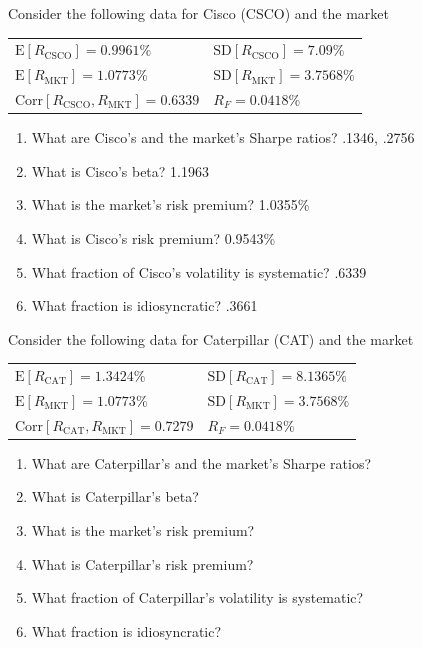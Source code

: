 \documentclass{beamer}
\begin{document}
\begin{frame}{}
	Consider the following data for Cisco (CSCO) and the market
	\begin{center}
		\begin{tabular}{ll}
			$\text{E}[R_{\text{CSCO}}]=0.9961\%$ & $\text{SD}[R_{\text{CSCO}}]=7.09\%$ \\
			$\text{E}[R_{\text{MKT}}]=1.0773\%$ & $\text{SD}[R_{\text{MKT}}]=3.7568\%$ \\
			$\text{Corr}[R_{\text{CSCO}},R_{\text{MKT}}]=0.6339$ & $R_{F}=0.0418\%$
		\end{tabular}
	\end{center}
\begin{enumerate}
	\item What are Cisco's and the market's Sharpe ratios? {\color{blue} .1346, .2756} 
	\item What is Cisco's beta? {\color{blue}1.1963}
	\item What is the market's risk premium? {\color{blue}1.0355\%}
	\item What is Cisco's risk premium? {\color{blue}0.9543\%}
	\item What fraction of Cisco's volatility is systematic? {\color{blue} .6339}
	\item What fraction is idiosyncratic? {\color{blue} .3661}
\end{enumerate}
\end{frame}

\begin{frame}{}
	Consider the following data for Caterpillar (CAT) and the market
	\begin{center}
		\begin{tabular}{ll}
			$\text{E}[R_{\text{CAT}}]=1.3424\%$ & $\text{SD}[R_{\text{CAT}}]=8.1365\%$ \\
			$\text{E}[R_{\text{MKT}}]=1.0773\%$ & $\text{SD}[R_{\text{MKT}}]=3.7568\%$ \\
			$\text{Corr}[R_{\text{CAT}},R_{\text{MKT}}]=0.7279$ & $R_{F}=0.0418\%$
		\end{tabular}
	\end{center}
\begin{enumerate}
	\item What are Caterpillar's and the market's Sharpe ratios? 
	\item What is Caterpillar's beta?
	\item What is the market's risk premium? 
	\item What is Caterpillar's risk premium? 
	\item What fraction of Caterpillar's volatility is systematic? 
	\item What fraction is idiosyncratic?
\end{enumerate}
\end{frame}
\end{document}

